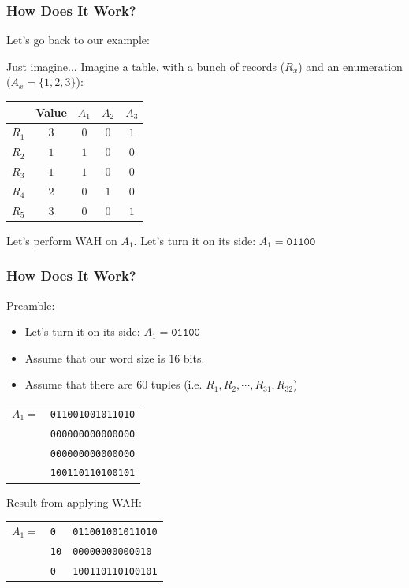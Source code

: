 \documentclass[11pt]{beamer}
\begin{document}
\begin{frame}
	\frametitle{How Does It Work?}
	
	Let's go back to our example:
	\begin{exampleblock}{Just imagine...}
		Imagine a table, with a bunch of records ($R_x$) and an enumeration ($A_x = \{1, 2, 3\}$):
	
		\begin{tabular}{r|c|c|c|c}
				& \textbf{Value} & $A_1$ & $A_2$ & $A_3$ \\ \hline
			$R_1$ & $3$	& $0$	& $0$	& $1$ \\
			$R_2$ & $1$	& $1$	& $0$	& $0$ \\
			$R_3$ & $1$	& $1$	& $0$	& $0$ \\
			$R_4$ & $2$	& $0$	& $1$	& $0$ \\
			$R_5$ & $3$	& $0$	& $0$	& $1$ 
		\end{tabular}
	\end{exampleblock}

	\pause
	Let's perform WAH on $A_1$. \pause Let's turn it on its side: $A_1 = \texttt{01100}$
\end{frame}

\begin{frame}
	\frametitle{How Does It Work?}
	
	Preamble:
	\begin{itemize}
		\item Let's turn it on its side: $A_1 = \texttt{01100}$
		\item Assume that our word size is $16$ bits.
		\item Assume that there are $60$ tuples (i.e. $R_1, R_2, \dotsm, R_{31}, R_{32}$)
	\end{itemize}
	
	\pause
	\begin{tabular}{rl}
		$A_1 =$	& \texttt{011001001011010} \\
				& \texttt{000000000000000} \\
				& \texttt{000000000000000} \\
				& \texttt{100110110100101}
	\end{tabular}
	
	\pause
	Result from applying WAH: \\
	\begin{tabular}{rll}
		$A_1 =$	& \texttt{0} 	& \texttt{011001001011010} \\
		\pause
				& \texttt{10} 	& \texttt{00000000000010} \\
		\pause
				& \texttt{0} 	& \texttt{100110110100101}
	\end{tabular}
\end{frame}
\end{document}

